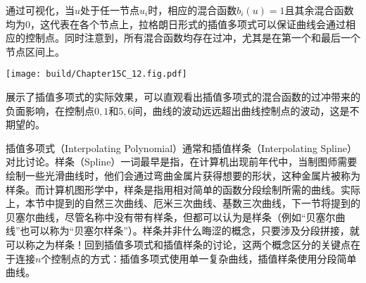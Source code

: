 通过可视化，当$u$处于任一节点$u_i$时，相应的混合函数$b_i(u)=1$且其余混合函数均为$0$，这代表在各个节点上，拉格朗日形式的插值多项式可以保证曲线会通过相应的控制点。同时注意到，所有混合函数均存在过冲，尤其是在第一个和最后一个节点区间上。

\begin{Figure}[拉格朗日形式插值多项式的效果]
    \texttt{[image: build/Chapter15C\_12.fig.pdf]}
\end{Figure}

展示了插值多项式的实际效果，可以直观看出插值多项式的混合函数的过冲带来的负面影响，在控制点$0,1$和$5,6$间，曲线的波动远远超出曲线控制点的波动，这是不期望的。



插值多项式（Interpolating Polynomial）通常和插值样条（Interpolating Spline）对比讨论。样条（Spline）一词最早是指，在计算机出现前年代中，当制图师需要绘制一些光滑曲线时，他们会通过弯曲金属片获得想要的形状，这种金属片被称为样条。而计算机图形学中，样条是指用相对简单的函数分段绘制所需的曲线。实际上，本节中提到的自然三次曲线、厄米三次曲线、基数三次曲线，下一节将提到的贝塞尔曲线，尽管名称中没有带有样条，但都可以认为是样条（例如“贝塞尔曲线”也可以称为“贝塞尔样条”）。样条并非什么晦涩的概念，只要涉及分段拼接，就可以称之为样条！回到插值多项式和插值样条的讨论，这两个概念区分的关键点在于连接$n$个控制点的方式：插值多项式使用单一复杂曲线，插值样条使用分段简单曲线。
